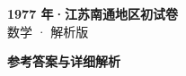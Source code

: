 \documentclass[zihao=-4, a4paper]{ctexart}
\begin{document}
\begin{center}
  {\Large\bfseries 1977 年·江苏南通地区初试卷}\\[4pt]
  {\large 数学 · 解析版}
\end{center}
\medskip
{}

\clearpage
{}
\begin{center}{\Large\bfseries 参考答案与详细解析}\end{center}
\medskip

\end{document}
